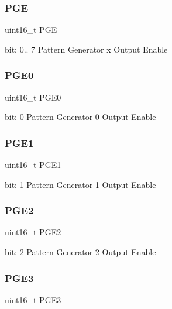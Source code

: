 \subsubsection{\texorpdfstring{PGE}{PGE}}
{\footnotesize\ttfamily uint16\+\_\+t P\+GE}

bit\+: 0.. 7 Pattern Generator x Output Enable \mbox{\label{union_t_c_c___p_a_t_t___type_aaff06f2b23ff179239d944930d172b06}} 
\subsubsection{\texorpdfstring{PGE0}{PGE0}}
{\footnotesize\ttfamily uint16\+\_\+t P\+G\+E0}

bit\+: 0 Pattern Generator 0 Output Enable \mbox{\label{union_t_c_c___p_a_t_t___type_a72ec5b1e784f8c3ca81f16eb99fefa8a}} 
\subsubsection{\texorpdfstring{PGE1}{PGE1}}
{\footnotesize\ttfamily uint16\+\_\+t P\+G\+E1}

bit\+: 1 Pattern Generator 1 Output Enable \mbox{\label{union_t_c_c___p_a_t_t___type_ad38e6fdff613f641ac4f3bde346ad520}} 
\subsubsection{\texorpdfstring{PGE2}{PGE2}}
{\footnotesize\ttfamily uint16\+\_\+t P\+G\+E2}

bit\+: 2 Pattern Generator 2 Output Enable \mbox{\label{union_t_c_c___p_a_t_t___type_af4c6eb8d96c4f56f22cedfa7a5769e38}} 
\subsubsection{\texorpdfstring{PGE3}{PGE3}}
{\footnotesize\ttfamily uint16\+\_\+t P\+G\+E3}

